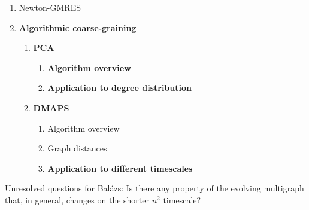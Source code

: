 \documentclass[12pt]{article}
\begin{document}
\begin{singlespace}
\begin{enumerate}
  \item Newton-GMRES
  \item \textbf{Algorithmic coarse-graining}
    \begin{enumerate}
      \item \textbf{PCA}
        \begin{enumerate}
          \item \textbf{Algorithm overview}
          \item \textbf{Application to degree distribution}
        \end{enumerate}
      \item \textbf{DMAPS}
        \begin{enumerate}
          \item Algorithm overview
          \item Graph distances
          \item \textbf{Application to different timescales}
        \end{enumerate}
    \end{enumerate}
  \end{enumerate}

Unresolved questions for Bal\'{a}zs: Is there any property of the evolving multigraph that, in general, changes on the shorter $n^2$ timescale?

\end{singlespace}

\end{document}
